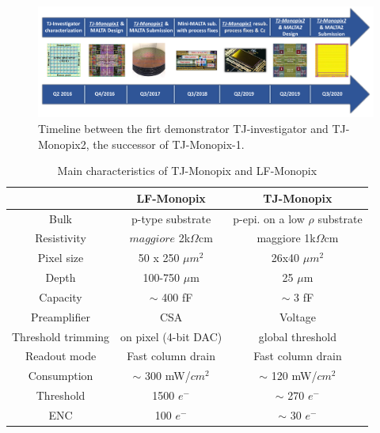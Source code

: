 \begin{figure}[h!]
    \centering
    \includegraphics[width=.95\linewidth]{figures/Monopix1/TJ180nm.png}
    \caption{Timeline between the firt demonstrator TJ-investigator and TJ-Monopix2, the successor of TJ-Monopix-1.}
    \label{fig:TJ180nm}
\end{figure} 

\begin{table}
    \begin{center}
    \begin{tabular}{|c | c |c |}
    \hline
    & LF-Monopix & TJ-Monopix\\
    \hline
    \hline
    Bulk & p-type substrate & p-epi. on a low $\rho$ substrate \\
    Resistivity & $maggiore$ 2k$\Omega$cm & maggiore 1k$\Omega$cm\\
    Pixel size & 50 x 250 $\mu m^2$ & 26x40 $\mu m^2$ \\
    Depth & 100-750 $\mu$m & 25 $\mu$m \\
    Capacity & $\sim$ 400 fF & $\sim$ 3 fF\\
    Preamplifier & CSA & Voltage \\
    Threshold trimming & on pixel (4-bit DAC) & global threshold\\
    Readout mode & Fast column drain & Fast column drain\\
    Consumption & $\sim$ 300 mW/$cm^2$& $\sim$ 120 mW/$cm^2$ \\
    Threshold & 1500 $e^-$ & $\sim$ 270 $e^-$ \\
    ENC & 100 $e^-$ & $\sim$ 30 $e^-$\\
    \hline
    \end{tabular}
    \caption{Main characteristics of TJ-Monopix and LF-Monopix \cite{LF-TJ-Monopix}}
    \label{tab:LF-TJ-Monopix}
    \end{center}
 \end{table}

